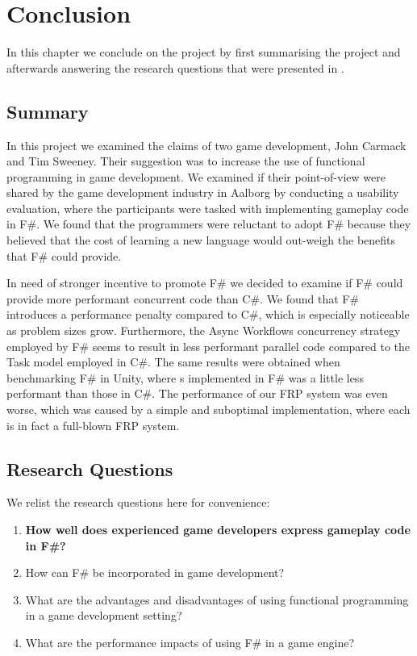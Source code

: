 \chapter{Conclusion}
In this chapter we conclude on the project by first summarising the project and afterwards answering the research questions that were presented in . 

\section{Summary}
In this project we examined the claims of two game development, John Carmack and Tim Sweeney. Their suggestion was to increase the use of functional programming in game development. We examined if their point-of-view were shared by the game development industry in Aalborg by conducting a usability evaluation, where the participants were tasked with implementing gameplay code in F\#. We found that the programmers were reluctant to adopt F\# because they believed that the cost of learning a new language would out-weigh the benefits that F\# could provide. 

In need of stronger incentive to promote F\# we decided to examine if F\# could provide more performant concurrent code than C\#. We found that F\# introduces a performance penalty compared to C\#, which is especially noticeable as problem sizes grow. Furthermore, the Async Workflows concurrency strategy employed by F\# seems to result in less performant parallel code compared to the Task model employed in C\#. The same results were obtained when benchmarking F\# in Unity, where s implemented in F\# was a little less performant than those in C\#. The performance of our \gls{FRP} system was even worse, which was caused by a simple and suboptimal implementation, where each  is in fact a full-blown \gls{FRP} system.

\section{Research Questions}
We relist the research questions here for convenience:
\begin{center}
    \begin{enumerate}
        \item \textbf{How well does experienced game developers express gameplay code in F\#?}
        \item How can F\# be incorporated in game development?
        \item What are the advantages and disadvantages of using functional programming in a game development setting?
        \item What are the performance impacts of using F\# in a game engine?
    \end{enumerate}
\end{center}

